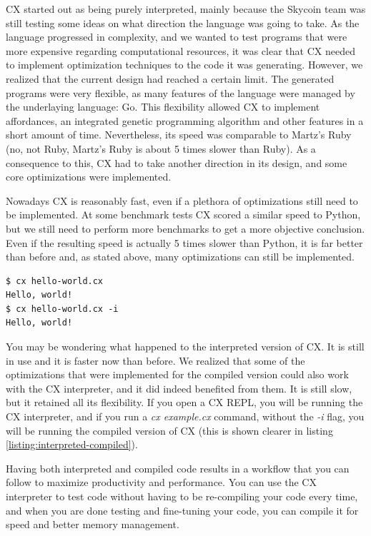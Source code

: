 \documentclass[11pt,fleqn,openany]{book} %
\begin{document}
CX started out as being purely interpreted, mainly because the Skycoin team was still testing some ideas on what direction the language was going to take. As the language progressed in complexity, and we wanted to test programs that were more expensive regarding computational resources, it was clear that CX needed to implement optimization techniques to the code it was generating. However, we realized that the current design had reached a certain limit. The generated programs were very flexible, as many features of the language were managed by the underlaying language: Go. This flexibility allowed CX to implement affordances, an integrated genetic programming algorithm and other features in a short amount of time. Nevertheless, its speed was comparable to Martz's Ruby (no, not Ruby, Martz's Ruby is about 5 times slower than Ruby). As a consequence to this, CX had to take another direction in its design, and some core optimizations were implemented.

Nowadays CX is reasonably fast, even if a plethora of optimizations still need to be implemented. At some benchmark tests CX scored a similar speed to Python, but we still need to perform more benchmarks to get a more objective conclusion. Even if the resulting speed is actually 5 times slower than Python, it is far better than before and, as stated above, many optimizations can still be implemented.

\begin{lstlisting}[caption={Interpreting and compiling the same program},captionpos=b,label={listing:interpreted-compiled}]
$ cx hello-world.cx
Hello, world!
$ cx hello-world.cx -i
Hello, world!
\end{lstlisting}

You may be wondering what happened to the interpreted version of CX. It is still in use and it is faster now than before. We realized that some of the optimizations that were implemented for the compiled version could also work with the CX interpreter, and it did indeed benefited from them. It is still slow, but it retained all its flexibility. If you open a CX REPL, you will be running the CX interpreter, and if you run a \emph{cx example.cx} command, without the \emph{-i} flag, you will be running the compiled version of CX (this is shown clearer in listing \ref{listing:interpreted-compiled}).

Having both interpreted and compiled code results in a workflow that you can follow to maximize productivity and performance. You can use the CX interpreter to test code without having to be re-compiling your code every time, and when you are done testing and fine-tuning your code, you can compile it for speed and better memory management.
\end{document}
